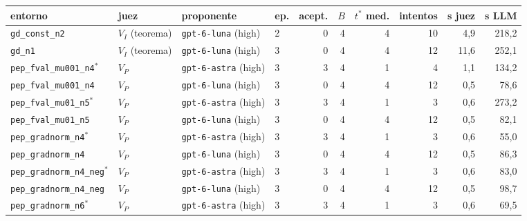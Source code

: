 \documentclass[11pt,a4paper]{article}
\begin{document}
\begin{table}[!ht]
\centering
\scriptsize
\setlength{\tabcolsep}{4pt}
\begin{tabular}{@{}llllrrrrrr@{}}
\toprule
entorno & juez & proponente & ep. & acept. & $B$ & $t^*$ med. & intentos & s juez & s LLM \\
\midrule
\texttt{gd\_\allowbreak{}const\_\allowbreak{}n2} & $V_I$ (teorema) & \texttt{gpt-\allowbreak{}6-\allowbreak{}luna} (high) & 2 & 0 & 4 & 4 & 10 & 4{,}9 & 218{,}2 \\
\texttt{gd\_\allowbreak{}n1} & $V_I$ (teorema) & \texttt{gpt-\allowbreak{}6-\allowbreak{}luna} (high) & 3 & 0 & 4 & 4 & 12 & 11{,}6 & 252{,}1 \\
\texttt{pep\_\allowbreak{}fval\_\allowbreak{}mu001\_\allowbreak{}n4}$^\ast$ & $V_P$ & \texttt{gpt-\allowbreak{}6-\allowbreak{}astra} (high) & 3 & 3 & 4 & 1 & 4 & 1{,}1 & 134{,}2 \\
\texttt{pep\_\allowbreak{}fval\_\allowbreak{}mu001\_\allowbreak{}n4} & $V_P$ & \texttt{gpt-\allowbreak{}6-\allowbreak{}luna} (high) & 3 & 0 & 4 & 4 & 12 & 0{,}5 & 78{,}6 \\
\texttt{pep\_\allowbreak{}fval\_\allowbreak{}mu01\_\allowbreak{}n5}$^\ast$ & $V_P$ & \texttt{gpt-\allowbreak{}6-\allowbreak{}astra} (high) & 3 & 3 & 4 & 1 & 3 & 0{,}6 & 273{,}2 \\
\texttt{pep\_\allowbreak{}fval\_\allowbreak{}mu01\_\allowbreak{}n5} & $V_P$ & \texttt{gpt-\allowbreak{}6-\allowbreak{}luna} (high) & 3 & 0 & 4 & 4 & 12 & 0{,}5 & 82{,}1 \\
\texttt{pep\_\allowbreak{}gradnorm\_\allowbreak{}n4}$^\ast$ & $V_P$ & \texttt{gpt-\allowbreak{}6-\allowbreak{}astra} (high) & 3 & 3 & 4 & 1 & 3 & 0{,}6 & 55{,}0 \\
\texttt{pep\_\allowbreak{}gradnorm\_\allowbreak{}n4} & $V_P$ & \texttt{gpt-\allowbreak{}6-\allowbreak{}luna} (high) & 3 & 0 & 4 & 4 & 12 & 0{,}5 & 86{,}3 \\
\texttt{pep\_\allowbreak{}gradnorm\_\allowbreak{}n4\_\allowbreak{}neg}$^\ast$ & $V_P$ & \texttt{gpt-\allowbreak{}6-\allowbreak{}astra} (high) & 3 & 3 & 4 & 1 & 3 & 0{,}6 & 83{,}0 \\
\texttt{pep\_\allowbreak{}gradnorm\_\allowbreak{}n4\_\allowbreak{}neg} & $V_P$ & \texttt{gpt-\allowbreak{}6-\allowbreak{}luna} (high) & 3 & 0 & 4 & 4 & 12 & 0{,}5 & 98{,}7 \\
\texttt{pep\_\allowbreak{}gradnorm\_\allowbreak{}n6}$^\ast$ & $V_P$ & \texttt{gpt-\allowbreak{}6-\allowbreak{}astra} (high) & 3 & 3 & 4 & 1 & 3 & 0{,}6 & 69{,}5 \\

\end{tabular}
\end{table}
\end{document}
